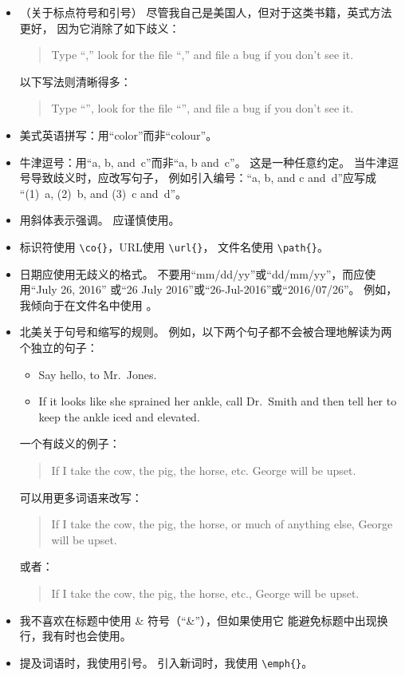 \begin{itemize}
\item （关于标点符号和引号）
  尽管我自己是美国人，但对于这类书籍，英式方法更好，
  因为它消除了如下歧义：
  \begin{quote}
    Type ``,'' look for the file ``,''
    and file a bug if you don't see it.
  \end{quote}

  以下写法则清晰得多：
  \begin{quote}
    Type ``'', look for the file ``'',
    and file a bug if you don't see it.
  \end{quote}
\item 美式英语拼写：用``color''而非``colour''。
\item 牛津逗号：用``a, b, and~c''而非``a, b and~c''。
  这是一种任意约定。
  当牛津逗号导致歧义时，应改写句子，
  例如引入编号：``a, b, and c and~d''应写成
  ``(1)~a, (2)~b, and (3)~c and~d''。
\item 用斜体表示强调。
  应谨慎使用。
\item 标识符使用 \verb|\co{}|，URL使用 \verb|\url{}|，
  文件名使用 \verb|\path{}|。
\item 日期应使用无歧义的格式。
  不要用``mm/dd/yy''或``dd/mm/yy''，而应使用``July 26, 2016''
  或``26 July 2016''或``26-Jul-2016''或``2016/07/26''。
  例如，我倾向于在文件名中使用 。
\item 北美关于句号和缩写的规则。
  例如，以下两个句子都不会被合理地解读为两个独立的句子：
  \begin{itemize}
  \item Say hello, to Mr.~Jones.
  \item If it looks like she sprained her ankle, call Dr.~Smith and
    then tell her to keep the ankle iced and elevated.
  \end{itemize}

  一个有歧义的例子：
  \begin{quote}
    If I take the cow, the pig, the horse, etc. George will be upset.
  \end{quote}
  可以用更多词语来改写：
  \begin{quote}
    If I take the cow, the pig, the horse, or much of anything else,
    George will be upset.
  \end{quote}
  或者：
  \begin{quote}
    If I take the cow, the pig, the horse, etc., George will be upset.
  \end{quote}
\item 我不喜欢在标题中使用 \& 符号（``\&''），但如果使用它
  能避免标题中出现换行，我有时也会使用。
\item 提及词语时，我使用引号。
  引入新词时，我使用 \verb|\emph{}|。
\end{itemize}

